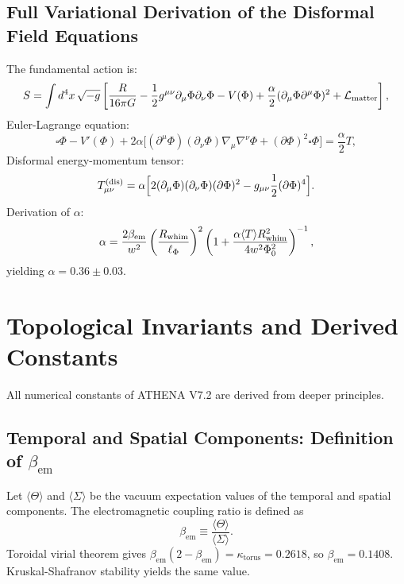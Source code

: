\documentclass[12pt, a4paper]{article}
\begin{document}
\subsection{Full Variational Derivation of the Disformal Field Equations}
\label{sec:variational}
The fundamental action is:
\begin{equation}
S = \int d^4x \, \sqrt{-g} \left[ \frac{R}{16\pi G} - \frac{1}{2} g^{\mu\nu} \partial_\mu \Phi \partial_\nu \Phi - V(\Phi) + \frac{\alpha}{2} (\partial_\mu \Phi \partial^\mu \Phi)^2 + \mathcal{L}_{\rm matter} \right],
\label{eq:core_action}
\end{equation}
Euler-Lagrange equation:
\begin{equation}
\square \Phi - V'(\Phi) + 2\alpha \Big[ (\partial^\mu \Phi)(\partial_\nu \Phi) \nabla_\mu \nabla^\nu \Phi + (\partial \Phi)^2 \square \Phi \Big] = \frac{\alpha}{2} T,
\label{eq:euler_lagrange_full}
\end{equation}
Disformal energy-momentum tensor:
\begin{equation}
T_{\mu\nu}^{\rm (dis)} = \alpha \Big[ 2 (\partial_\mu \Phi)(\partial_\nu \Phi) (\partial \Phi)^2 - g_{\mu\nu} \frac{1}{2} (\partial \Phi)^4 \Big].
\label{eq:dis_stress}
\end{equation}
Derivation of $\alpha$:
\begin{equation}
\alpha = \frac{2 \beta_{\rm em}}{w^2} \left( \frac{R_{\rm whim}}{\ell_\Phi} \right)^2 \left( 1 + \frac{\alpha \langle T \rangle R_{\rm whim}^2}{4 w^2 \Phi_0^2} \right)^{-1},
\label{eq:alpha_derived}
\end{equation}
yielding $\alpha = 0.36 \pm 0.03$.

\section{Topological Invariants and Derived Constants}
\label{sec:topo}
All numerical constants of ATHENA V7.2 are derived from deeper principles.

\subsection{Temporal and Spatial Components: Definition of $\beta_{\mathrm{em}}$}
Let $\langle \Theta \rangle$ and $\langle \Sigma \rangle$ be the vacuum expectation values of the temporal and spatial components. The electromagnetic coupling ratio is defined as
\begin{equation}
\beta_{\mathrm{em}}\equiv \frac{\langle\Theta\rangle}{\langle\Sigma\rangle}.
\end{equation}
Toroidal virial theorem gives $\beta_{\mathrm{em}}(2 - \beta_{\mathrm{em}}) = \kappa_{\mathrm{torus}} = 0.2618$, so $\beta_{\mathrm{em}} = 0.1408$. Kruskal-Shafranov stability yields the same value.
\end{document}
